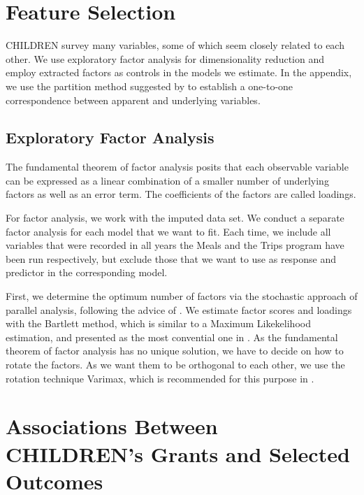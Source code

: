 \documentclass[12pt, a4paper, titlepage]{article}\usepackage[]{graphicx}\usepackage[]{color}
\begin{document}
\section{Feature Selection}

CHILDREN survey many variables, some of which seem closely related to each other. We use exploratory factor analysis for dimensionality reduction and employ extracted factors as controls in the models we estimate. In the appendix, we use the partition method suggested by \textcite{Millstein.2020} to establish a one-to-one correspondence between apparent and underlying variables.

\subsection{Exploratory Factor Analysis}

The fundamental theorem of factor analysis posits that each observable variable can be expressed as a linear combination of a smaller number of underlying factors as well as an error term. The coefficients of the factors are called loadings. \parencite[p.310]{Moosbrugger.2008} 

For factor analysis, we work with the imputed data set. We conduct a separate factor analysis for each model that we want to fit. Each time, we include all variables that were recorded in all years the Meals and the Trips program have been run respectively, but exclude those that we want to use as response and predictor in the corresponding model. 

First, we determine the optimum number of factors via the stochastic approach of parallel analysis, following the advice of \textcite[p.313]{Moosbrugger.2008}.
We estimate factor scores and loadings with the Bartlett method, which is similar to a Maximum Likekelihood estimation, and presented as the most convential one in \textcite[p.291]{Eid.2014}.
As the fundamental theorem of factor analysis has no unique solution, we have to decide on how to rotate the factors. As we want them to be orthogonal to each other, we use the rotation technique Varimax, which is recommended for this purpose in \textcite[p.317]{Price.2017}. 


\section{Associations Between CHILDREN's Grants and Selected Outcomes}
\end{document}
